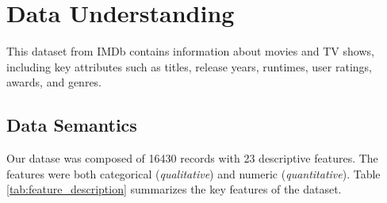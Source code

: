 \documentclass[10pt]{article}
\begin{document}
\section{Data Understanding}
This dataset from IMDb contains information about movies and TV shows, including key attributes such as titles, release years, runtimes, user ratings, awards, and genres.
\subsection{Data Semantics}
Our datase was composed of 16430 records with 23 descriptive features. The features were both categorical (\textit{qualitative}) and numeric (\textit{quantitative}). Table \ref{tab:feature_description} summarizes the key features of the dataset.
\setlength{\tabcolsep}{6pt} %
\renewcommand{\arraystretch}{1.3} %
\end{document}
